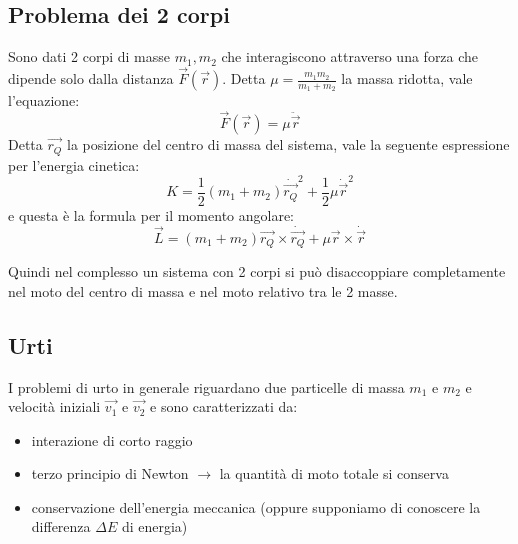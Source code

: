 \documentclass[../main.tex]{subfiles}
\begin{document}
\subsection{Problema dei 2 corpi}
Sono dati 2 corpi di masse $m_1,m_2$ che interagiscono attraverso una forza che dipende 
solo dalla distanza $\vec F(\vec r)$.
Detta $\mu=\frac{m_1m_2}{m_1+m_2}$ la massa ridotta, vale l'equazione:
\begin{equation}\label{ForzaMassaRidotta}
	\vec F(\vec r)=\mu \ddot {\vec{r}}
\end{equation}
Detta $\overrightarrow{ r_Q }$ la posizione del centro di massa del sistema, vale la seguente espressione per l'energia cinetica:
\begin{equation}\label{Cinetica2Corpi}
	K=\frac12(m_1+m_2)\dot{\overrightarrow{r_Q}}^2+\frac12\mu\dot{\vec{r}}^2
\end{equation}
e questa è la formula per il momento angolare:
\begin{equation}\label{Momento2Corpi}
	\vec L=(m_1+m_2)\overrightarrow{r_Q}\times \dot{\overrightarrow{r_Q}}+\mu \vec r\times\dot{\vec r}
\end{equation}

Quindi nel complesso un sistema con 2 corpi si può disaccoppiare completamente nel moto del centro di massa e nel
moto relativo tra le 2 masse.

\subsection{Urti}
I problemi di urto in generale riguardano due particelle di massa $m_1$ e $m_2$ e velocità iniziali $\overrightarrow {v_1}$ e $\overrightarrow {v_2}$ e sono caratterizzati da:
\begin{itemize}
 \item interazione di corto raggio
 \item terzo principio di Newton $\rightarrow$ la quantità di moto totale si conserva
 \item conservazione dell'energia meccanica (oppure supponiamo di conoscere la differenza $\Delta E$ di energia)
\end{itemize}
\end{document}
